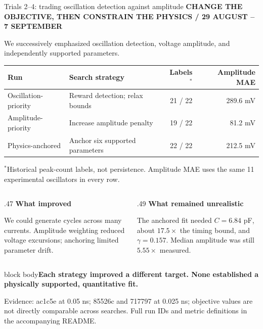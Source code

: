 \documentclass[aspectratio=169,11pt]{beamer}
\newcommand{\eyebrow}[1]{{\color{teal}\scriptsize\bfseries\MakeUppercase{#1}}\par\vspace{2mm}}
\newcommand{\takeaway}[1]{\par\vspace{2mm}\begin{beamercolorbox}[sep=2mm,wd=\linewidth]{block body}\small\bfseries #1\end{beamercolorbox}}
\newcommand{\src}[1]{\par\vfill{\fontsize{6.5}{8}\selectfont\color{muted}Evidence: #1. Full run IDs and metric definitions in the accompanying README.\par}}
\begin{document}
\begin{frame}[t]{Trials 2--4: trading oscillation detection against amplitude}
\eyebrow{Change the objective, then constrain the physics / 29 August -- 7 September}
\small We successively emphasized oscillation detection, voltage amplitude, and independently supported parameters.
\vspace{3mm}
\renewcommand{\arraystretch}{1.38}
\begin{tabular}{@{}p{3.6cm}p{6.0cm}rr@{}}
\toprule
\textbf{Run} & \textbf{Search strategy} & \textbf{Labels$^{*}$} & \textbf{Amplitude MAE}\\\midrule
Oscillation-priority & Reward detection; relax bounds & 21 / 22 & 289.6 mV\\
Amplitude-priority & Increase amplitude penalty & 19 / 22 & 81.2 mV\\
Physics-anchored & Anchor six supported parameters & 22 / 22 & 212.5 mV\\\bottomrule
\end{tabular}\par
\vspace{2mm}
{\scriptsize\color{muted}$^{*}$Historical peak-count labels, not persistence. Amplitude MAE uses the same 11 experimental oscillators in every row.\par}
\vspace{3mm}
\begin{columns}[T,onlytextwidth]
\begin{column}{.47\textwidth}
\textbf{What improved}\par\small
We could generate cycles across many currents. Amplitude weighting reduced voltage excursions; anchoring limited parameter drift.
\end{column}
\begin{column}{.49\textwidth}
\textbf{What remained unrealistic}\par\small
The anchored fit needed $C=6.84$ pF, about $17.5\times$ the timing bound, and $\gamma=0.157$. Median amplitude was still $5.55\times$ measured.
\end{column}
\end{columns}
\takeaway{Each strategy improved a different target. None established a physically supported, quantitative fit.}
\src{ac1c5e at 0.05 ns; 85526c and 717797 at 0.025 ns; objective values are not directly comparable across searches}
\end{frame}
\end{document}
